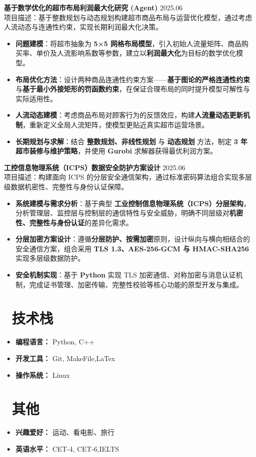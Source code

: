 \documentclass[11pt]{article}
\newlength{\interProjectSpacing}
\newcommand{\projectsep}{\vspace{\interProjectSpacing}}
\newlength{\intraProjectTitleSep}
\newcommand{\titlebreak}{\\[\intraProjectTitleSep]}
\newlength{\intraProjectListTopSep}
\begin{document}
\projectsep

\textbf{基于数学优化的超市布局利润最大化研究 (Agent)} \hfill 2025.06 \titlebreak
项目描述：基于整数规划与动态规划构建超市商品布局与运营优化模型，通过考虑人流动态与连通性约束，实现长期利润最大化决策。
\begin{itemize}[nosep, topsep=\intraProjectListTopSep]
    \item \textbf{问题建模}：将超市抽象为 \textbf{5×5 网格布局模型}，引入初始人流量矩阵、商品购买率、单价及人流影响系数等参数，建立以\textbf{利润最大化}为目标的数学优化模型。
    \item \textbf{布局优化方法}：设计两种商品连通性约束方案——\textbf{基于图论的严格连通性约束}与\textbf{基于最小外接矩形的罚函数约束}，在保证合理布局的同时提升模型可解性与实际适用性。
    \item \textbf{人流动态建模}：考虑商品布局对顾客行为的反馈效应，构建\textbf{人流量动态更新机制}，重新定义全局人流矩阵，使模型更贴近真实超市运营场景。
    \item \textbf{长期规划与求解}：结合 \textbf{整数规划、非线性规划} 与 \textbf{动态规划} 方法，制定 \textbf{3 年超市装修与维护策略}，并使用 \textbf{Gurobi} 求解器获得最优利润方案。
\end{itemize}

\projectsep

\textbf{工控信息物理系统（ICPS）数据安全防护方案设计} \hfill 2025.06 \titlebreak
项目描述：构建面向 ICPS 的分层安全通信架构，通过标准密码算法组合实现多层级数据机密性、完整性与身份认证保障。
\begin{itemize}[nosep, topsep=\intraProjectListTopSep]
    \item \textbf{系统建模与需求分析}：基于典型 \textbf{工业控制信息物理系统（ICPS）分层架构}，分析管理层、监控层与控制层的通信特性与安全威胁，明确不同层级对\textbf{机密性、完整性与身份认证}的差异化需求。
    \item \textbf{分层加密方案设计}：遵循\textbf{分层防护、按需加密}原则，设计纵向与横向相结合的安全通信方案，组合采用 \textbf{TLS 1.3、AES-256-GCM 与 HMAC-SHA256} 实现多层级数据防护。
    \item \textbf{安全机制实现}：基于 \textbf{Python} 实现 TLS 加密通信、对称加密与消息认证机制，完成证书管理、加密传输、完整性校验等核心功能的原型开发与集成。
\end{itemize}


\section{\makebox[\widthof{\faCogs}][c]{\color{CVBlue}\faCogs}\ 技术栈}
\begin{itemize}[nosep]
    \item \textbf{编程语言：}  Python, C++
    \item \textbf{开发工具：}  Git, MakeFile,LaTex
    \item \textbf{操作系统：} Linux
\end{itemize}
    
\section{\makebox[\widthof{\faInfo}][c]{\color{CVBlue}\faInfo}\ 其他}
\begin{itemize}[parsep=0.5ex]
    \item \textbf{兴趣爱好：} 运动、看电影、旅行
    \item \textbf{英语水平：} CET-4, CET-6,IELTS
\end{itemize}
\end{document}
